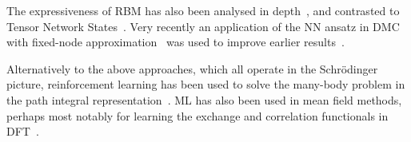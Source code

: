 The expressiveness of RBM has also been analysed in depth~\cite{carleo2018constructing}, and contrasted to Tensor Network States~\cite{clark2018unifying}. Very recently an application of the NN ansatz in DMC with fixed-node approximation~\cite{wilson2021simulations} was used to improve earlier results~\cite{pfau2020ab}.

Alternatively to the above approaches, which all operate in the Schr\" odinger picture, reinforcement learning has been used to solve the many-body problem in the path integral representation~\cite{barr2020quantum, gispen2020ground}. ML has also been used in mean field methods, perhaps most notably for learning the exchange and correlation functionals in DFT~\cite{dick2020machine}.
